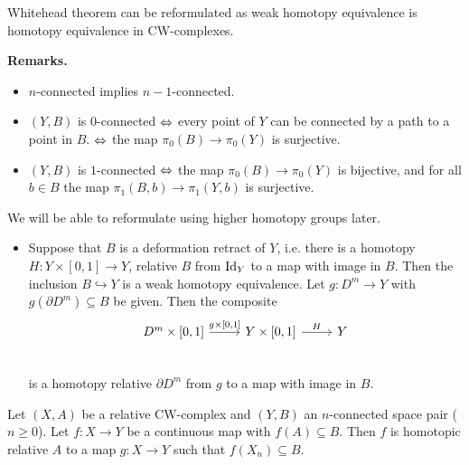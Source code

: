 \documentclass{TemplateLecture}
\begin{document}
Whitehead theorem can be reformulated as weak homotopy equivalence is homotopy equivalence in CW-complexes.

\textbf{Remarks.} \begin{itemize}
    \item \(n\)-connected implies \(n-1\)-connected.
    \item \((Y,B)\) is \(0\)-connected \(\Leftrightarrow\) every point of \(Y\) can be connected by a path to a point in \(B\). \(\Leftrightarrow\) the map \(\pi_0(B) \to \pi_0(Y)\) is surjective.
    \item \((Y,B)\) is \(1\)-connected \(\Leftrightarrow\) the map \(\pi_0(B) \to \pi_0(Y)\) is bijective, and for all \(b \in B\) the map \(\pi_1(B,b) \to \pi_1(Y,b)\) is surjective.
\end{itemize}
We will be able to reformulate using higher homotopy groups later.
\begin{itemize}
    \item Suppose that \(B\) is a deformation retract of \(Y\), i.e. there is a homotopy \(H\colon Y \times [0,1] \to Y\), relative \(B\) from \(\mathrm{Id}_Y\) to a map with image in \(B\).
    Then the inclusion \(B \hookrightarrow Y\) is a weak homotopy equivalence.
    Let \(g\colon D^m \to Y\) with \(g(\partial D^m) \subseteq B\) be given. Then the composite
    \[\begin{tikzcd}
        {D^m \times [0,1]} \ar[r, "{g\times [0,1]}"] & {Y \times [0,1]} \ar[r, "H"] & Y \\
    \end{tikzcd}\]
    is a homotopy relative \(\partial D^m\) from \(g\) to a map with image in \(B\).
\end{itemize}

\begin{thm}{}{}
    Let \((X,A)\) be a relative CW-complex and \((Y,B)\) an \(n\)-connected space pair (\(n \geq 0\)). Let \(f\colon X \to Y\) be a continuous map with \(f(A) \subseteq B\). Then \(f\) is homotopic relative \(A\) to a map \(g\colon X \to Y\) such that \(f(X_n) \subseteq B\).
\end{thm}
\end{document}
